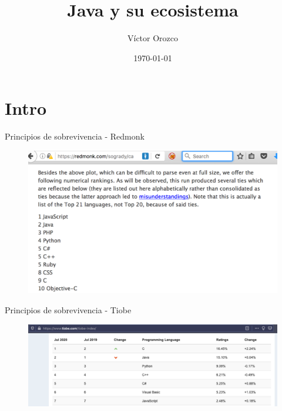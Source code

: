 \documentclass[aspectratio=169]{beamer}
\title{Java y su ecosistema}
\author{Víctor Orozco}
\institute{}
\date{\today}
\begin{document}
\frame{\titlepage}

\section{Intro}



\begin{frame}{Principios de sobrevivencia - Redmonk}
	\begin{figure}
		\centering
		\includegraphics[width=0.7\linewidth]{Images/redmonk}
	\end{figure}
\end{frame}

\begin{frame}{Principios de sobrevivencia - Tiobe}
	\begin{figure}
		\centering
		\includegraphics[width=0.9\linewidth]{Images/tiobe}
	\end{figure}
\end{frame}
\end{document}
